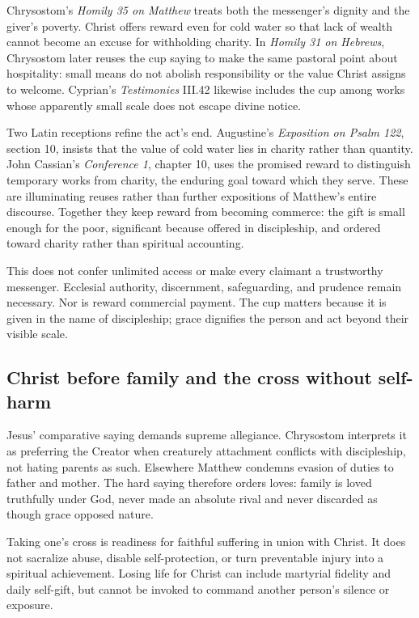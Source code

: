 Chrysostom's \emph{Homily 35 on Matthew} treats both the messenger's dignity and the giver's poverty. Christ offers reward even for cold water so that lack of wealth cannot become an excuse for withholding charity. In \emph{Homily 31 on Hebrews}, Chrysostom later reuses the cup saying to make the same pastoral point about hospitality: small means do not abolish responsibility or the value Christ assigns to welcome. Cyprian's \emph{Testimonies} III.42 likewise includes the cup among works whose apparently small scale does not escape divine notice.

Two Latin receptions refine the act's end. Augustine's \emph{Exposition on Psalm 122}, section 10, insists that the value of cold water lies in charity rather than quantity. John Cassian's \emph{Conference 1}, chapter 10, uses the promised reward to distinguish temporary works from charity, the enduring goal toward which they serve. These are illuminating reuses rather than further expositions of Matthew's entire discourse. Together they keep reward from becoming commerce: the gift is small enough for the poor, significant because offered in discipleship, and ordered toward charity rather than spiritual accounting.

This does not confer unlimited access or make every claimant a trustworthy messenger. Ecclesial authority, discernment, safeguarding, and prudence remain necessary. Nor is reward commercial payment. The cup matters because it is given in the name of discipleship; grace dignifies the person and act beyond their visible scale.

\subsection*{Christ before family and the cross without self-harm\enspace{}}

Jesus' comparative saying demands supreme allegiance. Chrysostom interprets it as preferring the Creator when creaturely attachment conflicts with discipleship, not hating parents as such. Elsewhere Matthew condemns evasion of duties to father and mother. The hard saying therefore orders loves: family is loved truthfully under God, never made an absolute rival and never discarded as though grace opposed nature.

Taking one's cross is readiness for faithful suffering in union with Christ. It does not sacralize abuse, disable self-protection, or turn preventable injury into a spiritual achievement. Losing life for Christ can include martyrial fidelity and daily self-gift, but cannot be invoked to command another person's silence or exposure.

